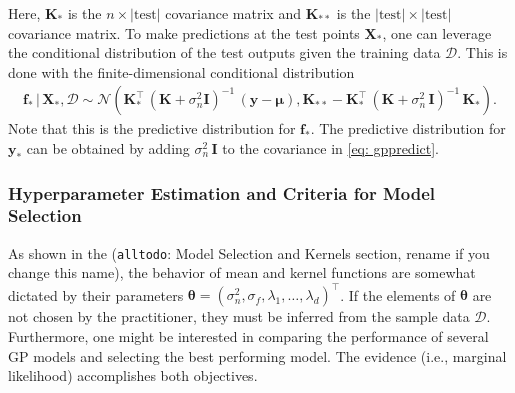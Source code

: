 \documentclass[journal=jacsat,manuscript=article]{achemso}
\newcommand{\alltodo}[1]{{\color{Cyan} (\texttt{alltodo}: #1)}}
\newcommand{\xmatrix}{\ensuremath{\mathbf{X}}}
\begin{document}
Here, $\mathbf{K}_*$ is the $n \times |\text{test}|$ covariance matrix and $\mathbf{K}_{**}$ is the $|\text{test}| \times |\text{test}|$ covariance matrix. 
To make predictions at the test points $\xmatrix_{*}$, one can leverage the conditional distribution of the test outputs given the training data $\mathcal{D}$. This is done with the finite-dimensional conditional distribution
\begin{gather}
    \mathbf{f}_* \,|\, \xmatrix_*, \mathcal{D} \sim \mathcal{N}(\mathbf{K}_{*}^\intercal \,(\mathbf{K} +\sigma_n^2 \mathbf{I})^{-1}\,(\mathbf{y}-\boldsymbol{\mu}),  \mathbf{K}_{**} - \mathbf{K}_{*}^\intercal \,(\mathbf{K}+\sigma_n^2\,\mathbf{I})^{-1}\,\mathbf{K}_{*}).   \label{eq: gppredict}
\end{gather}
Note that this is the predictive distribution for $\mathbf{f}_*$. The predictive distribution for $\mathbf{y}_*$ can be obtained by adding $\sigma_n^2\, \mathbf{I}$ to the covariance in \eqref{eq: gppredict}.

\subsubsection{Hyperparameter Estimation and Criteria for Model Selection}
As shown in the \alltodo{Model Selection and Kernels section, rename if you change this name}, the behavior of mean and kernel functions are somewhat dictated by their parameters $\boldsymbol{\theta} = (\sigma_n^2, \sigma_f, \lambda_1,\dots,\lambda_d)^\intercal$. If the elements of $\boldsymbol{\theta}$ are not chosen by the practitioner, they must be inferred from the sample data $\mathcal{D}$. Furthermore, one might be interested in comparing the performance of several GP models and selecting the best performing model. The evidence (i.e., marginal likelihood) accomplishes both objectives.
\end{document}
